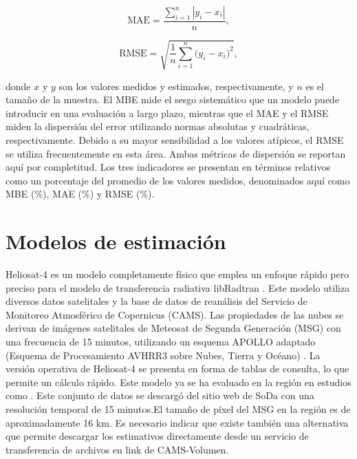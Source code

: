 \begin{equation}
\text{MAE} = \frac{\sum_{i=1}^{n} |{y_i} - {x_i} | }{n},
\end{equation}

\begin{equation}
\text{RMSE} = \sqrt{\frac{1}{n} \sum_{i=1}^{n} \Big({y_i - x_i}\Big)^2},
\label{ec:rrmsd}
\end{equation}

\noindent
donde $x$ y $y$ son los valores medidos y estimados, respectivamente, y $n$ es el tamaño de la muestra. El MBE mide el sesgo sistemático que un modelo puede introducir en una evaluación a largo plazo, mientras que el MAE y el RMSE miden la dispersión del error utilizando normas absolutas y cuadráticas, respectivamente. Debido a su mayor sensibilidad a los valores atípicos, el RMSE se utiliza frecuentemente en esta área. Ambas métricas de dispersión se reportan aquí por completitud. Los tres indicadores se presentan en términos relativos como un porcentaje del promedio de los valores medidos, denominados aquí como MBE (\%), MAE (\%) y RMSE (\%).


\section{Modelos de estimación}

Heliosat-4 \citep{qu2017} es un modelo completamente físico que emplea un enfoque rápido pero preciso para el modelo de transferencia radiativa libRadtran \citep{Mayer2005}. Este modelo utiliza diversos datos satelitales y la base de datos de reanálisis del Servicio de Monitoreo Atmosférico de Copernicus (CAMS). Las propiedades de las nubes se derivan de imágenes satelitales de Meteosat de Segunda Generación (MSG) con una frecuencia de 15 minutos, utilizando un esquema APOLLO adaptado (Esquema de Procesamiento AVHRR3 sobre Nubes, Tierra y Océano) \citep{Kriebel2003}. La versión operativa de Heliosat-4 se presenta en forma de tablas de consulta, lo que permite un cálculo rápido. Este modelo ya se ha evaluado en la región en estudios como \citep{Salazar2022, Salazar2025, Ledesma2023, Ledesma2024}. Este conjunto de datos se descargó del sitio web de SoDa con una resolución temporal de 15 minutos.El tamaño de píxel del MSG en la región es de aproximadamente 16 km. Es necesario indicar que existe también una alternativa que permite descargar los estimativos directamente desde un servicio de transferencia de archivos en link de CAMS-Volumen.\\


